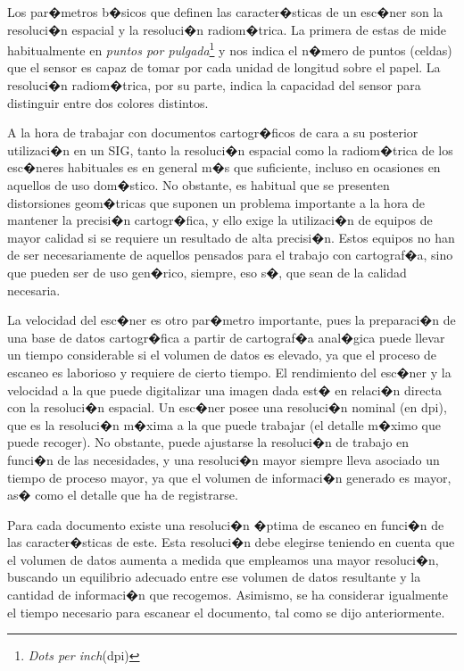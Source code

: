 Los par�metros b�sicos que definen las caracter�sticas de un esc�ner son la resoluci�n espacial y la resoluci�n radiom�trica. La primera de estas de mide habitualmente en \emph{puntos por pulgada}\footnote{\emph{Dots per inch}(dpi)} y nos indica el n�mero de puntos (celdas) que el sensor es capaz de tomar por cada unidad de longitud sobre el papel. La resoluci�n radiom�trica, por su parte, indica la capacidad del sensor para distinguir entre dos colores distintos.

A la hora de trabajar con documentos cartogr�ficos de cara a su posterior utilizaci�n en un SIG, tanto la resoluci�n espacial como la radiom�trica de los esc�neres habituales es en general m�s que suficiente, incluso en ocasiones en aquellos de uso dom�stico. No obstante, es habitual que se presenten distorsiones geom�tricas que suponen un problema importante a la hora de mantener la precisi�n cartogr�fica, y ello exige la utilizaci�n de equipos de mayor calidad si se requiere un resultado de alta precisi�n. Estos equipos no han de ser necesariamente de aquellos pensados para el trabajo con cartograf�a, sino que pueden ser de uso gen�rico, siempre, eso s�, que sean de la calidad necesaria.

La velocidad del esc�ner es otro par�metro importante, pues la preparaci�n de una base de datos cartogr�fica a partir de cartograf�a anal�gica puede llevar un tiempo considerable si el volumen de datos es elevado, ya que el proceso de escaneo es laborioso y requiere de cierto tiempo. El rendimiento del esc�ner y la velocidad a la que puede digitalizar una imagen dada est� en relaci�n directa con la resoluci�n espacial. Un esc�ner posee una resoluci�n nominal (en dpi), que es la resoluci�n m�xima a la que puede trabajar (el detalle m�ximo que puede recoger). No obstante, puede ajustarse la resoluci�n de trabajo en funci�n de las necesidades, y una resoluci�n mayor siempre lleva asociado un tiempo de proceso mayor, ya que el volumen de informaci�n generado es mayor, as� como el detalle que ha de registrarse.

Para cada documento existe una resoluci�n �ptima de escaneo en funci�n de las caracter�sticas de este. Esta resoluci�n debe elegirse teniendo en cuenta que el volumen de datos aumenta a medida que empleamos una mayor resoluci�n, buscando un equilibrio adecuado entre ese volumen de datos resultante y la cantidad de informaci�n que recogemos. Asimismo, se ha considerar igualmente el tiempo necesario para escanear el documento, tal como se dijo anteriormente.

